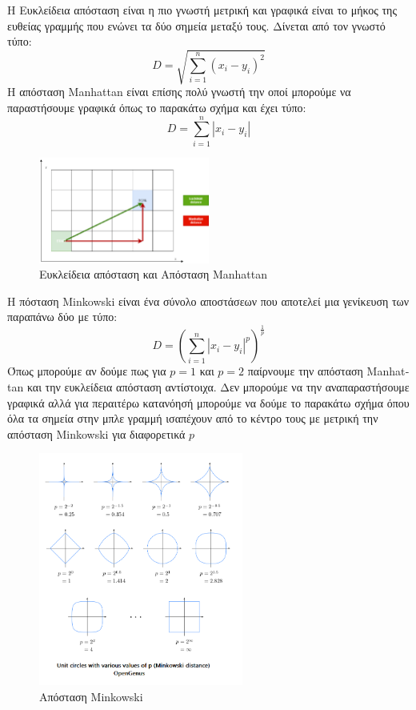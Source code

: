 Η Ευκλείδεια απόσταση είναι η πιο γνωστή μετρική και γραφικά είναι το μήκος της ευθείας γραμμής
που ενώνει τα δύο σημεία μεταξύ τους. Δίνεται από τον γνωστό τύπο:
$$D=\sqrt{\sum\limits_{i=1}^{n}(x_i-y_i)^2}$$
Η απόσταση \textlatin{Manhattan} είναι επίσης πολύ γνωστή την οποί μπορούμε να
παραστήσουμε γραφικά όπως το παρακάτω σχήμα και έχει τύπο:
$$D=\sum\limits_{i=1}^{n}\left\lvert x_i-y_i\right\rvert$$
\begin{figure}[H]
    \centering
    \includegraphics[width=0.5\textwidth]{images/manhattanDistance.png}
    \caption{Ευκλείδεια απόσταση και Απόσταση \textlatin{Manhattan}}
\end{figure}
Η πόσταση \textlatin{Minkowski} είναι ένα σύνολο αποστάσεων που αποτελεί μια γενίκευση των
παραπάνω δύο με τύπο:
$$D=\left(\sum\limits_{i=1}^{n}\left\lvert x_i-y_i\right\rvert^p\right)^{\frac{1}{p}}$$
Όπως μπορούμε αν δούμε πως για $p=1$ και $p=2$ παίρνουμε την απόσταση \textlatin{Manhattan} και
την ευκλείδεια απόσταση αντίστοιχα. Δεν μπορούμε να την αναπαραστήσουμε γραφικά αλλά για περαιτέρω
κατανόησή μπορούμε να δούμε το παρακάτω σχήμα όπου όλα τα σημεία στην μπλε γραμμή ισαπέχουν από το
κέντρο τους με μετρική την απόσταση \textlatin{Minkowski} για διαφορετικά $p$
\begin{figure}[H]
    \centering
    \includegraphics[width=0.6\textwidth]{images/minkowskiDistance.png}
    \caption{Απόσταση \textlatin{Minkowski}}
\end{figure}

